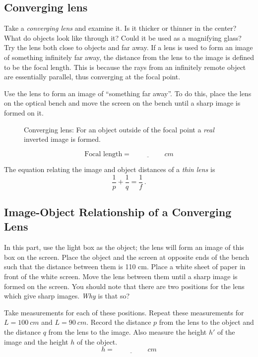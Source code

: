 \documentclass[11pt, a4paper]{article}
\begin{document}
\subsection{Converging lens}
Take a \textit{converging lens} and examine it.
Is it thicker or thinner in the center?
What do objects look like through it?
Could it be used as a magnifying glass?
Try the lens both close to objects and far away.
\fillwithlines{3cm}
If a lens is used to form an image of something infinitely far away, the
distance from the lens to the image is defined to be the focal length. 
This is because the rays from an infinitely remote object are essentially
parallel, thus converging at the focal point.

Use the lens to form an image of “something far away”. 
To do this, place the lens on the optical bench and move the screen on the
bench until a sharp image is formed on it. 
\begin{figure}[tbh]
    \centering
    \def\svgwidth{0.7\textwidth}
    
    \caption{Converging lens: For an object outside of the focal point a \textit{real}
    inverted image is formed.}
    \label{fig:convLens}
\end{figure}
\begin{equation*}
    \text{Focal length} = \underline{\hspace{2cm}}\si{cm}
\end{equation*}

The equation relating the image and object distances of a \textit{thin lens} is
\begin{equation}
    \frac{1}{p} + \frac{1}{q} = \frac{1}{f}\,.
    \label{eq:f}
\end{equation}

\subsection{Image-Object Relationship of a Converging Lens}
In this part, use the light box as the object; the lens will form an image of
this box on the screen.
Place the object and the screen at opposite ends of the bench such that the
distance between them is 110 cm.
Place a white sheet of paper in front of the white screen. 
Move the lens between them until a sharp image is formed on the screen.
You should note that there are two positions for the lens which give sharp
images. \textit{Why} is that so?
\fillwithlines{3cm}

Take measurements for each of these positions.
Repeat these measurements for $L = 100~\si{cm}$ and $L = 90~\si{cm}$.
Record the distance $p$ from the lens to the object and the distance
$q$ from the lens to the image.
Also measure the height $h'$ of the image and the height $h$
of the object.
\begin{equation*}
    h = \underline{\hspace{2cm}}\si{cm}
\end{equation*}
\end{document}
